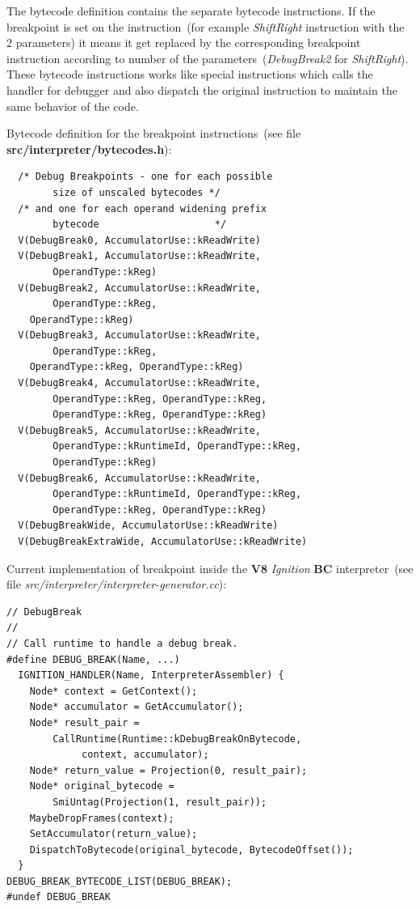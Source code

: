 \documentclass[thesis=M,english]{FITthesis}[2018/10/20]
\begin{document}
The bytecode definition contains the separate bytecode instructions. If the breakpoint is set on the instruction~(for example \textit{ShiftRight} instruction with the 2 parameters) it means it get replaced by the corresponding breakpoint instruction according to number of the parameters~(\textit{DebugBreak2} for \textit{ShiftRight}). These bytecode instructions works like special instructions which calls the handler for debugger and also dispatch the original instruction to maintain the same behavior of the code.

Bytecode definition for the breakpoint instructions~(see file \textbf{src/interpreter/bytecodes.h}):
\begin{lstlisting}
  /* Debug Breakpoints - one for each possible
  		size of unscaled bytecodes */
  /* and one for each operand widening prefix
  		bytecode                    */
  V(DebugBreak0, AccumulatorUse::kReadWrite)
  V(DebugBreak1, AccumulatorUse::kReadWrite,
  		OperandType::kReg)
  V(DebugBreak2, AccumulatorUse::kReadWrite,
  		OperandType::kReg,
    OperandType::kReg)
  V(DebugBreak3, AccumulatorUse::kReadWrite,
  		OperandType::kReg,
    OperandType::kReg, OperandType::kReg)
  V(DebugBreak4, AccumulatorUse::kReadWrite,
  		OperandType::kReg, OperandType::kReg,
  		OperandType::kReg, OperandType::kReg)
  V(DebugBreak5, AccumulatorUse::kReadWrite,
  		OperandType::kRuntimeId, OperandType::kReg,
  		OperandType::kReg)
  V(DebugBreak6, AccumulatorUse::kReadWrite,
  		OperandType::kRuntimeId, OperandType::kReg,
  		OperandType::kReg, OperandType::kReg)
  V(DebugBreakWide, AccumulatorUse::kReadWrite)
  V(DebugBreakExtraWide, AccumulatorUse::kReadWrite)
\end{lstlisting}


Current implementation of breakpoint inside the \textbf{V8} \textit{Ignition} \textbf{BC} interpreter~(see file \textit{src/interpreter/interpreter-generator.cc}):

\begin{lstlisting}
// DebugBreak
//
// Call runtime to handle a debug break.
#define DEBUG_BREAK(Name, ...)
  IGNITION_HANDLER(Name, InterpreterAssembler) {
    Node* context = GetContext();
    Node* accumulator = GetAccumulator();
    Node* result_pair =
        CallRuntime(Runtime::kDebugBreakOnBytecode,
        	 context, accumulator);
    Node* return_value = Projection(0, result_pair);
    Node* original_bytecode =
    	SmiUntag(Projection(1, result_pair));
    MaybeDropFrames(context);
    SetAccumulator(return_value);
    DispatchToBytecode(original_bytecode, BytecodeOffset());
  }
DEBUG_BREAK_BYTECODE_LIST(DEBUG_BREAK);
#undef DEBUG_BREAK
\end{lstlisting}
\end{document}
